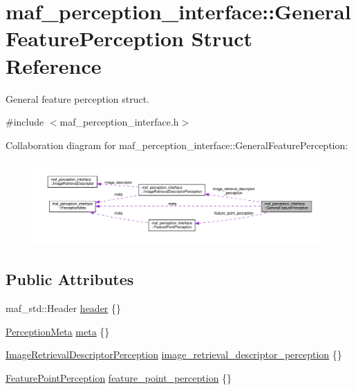 \hypertarget{structmaf__perception__interface_1_1GeneralFeaturePerception}{}\section{maf\+\_\+perception\+\_\+interface\+:\+:General\+Feature\+Perception Struct Reference}
\label{structmaf__perception__interface_1_1GeneralFeaturePerception}


General feature perception struct.  




{\ttfamily \#include $<$maf\+\_\+perception\+\_\+interface.\+h$>$}



Collaboration diagram for maf\+\_\+perception\+\_\+interface\+:\+:General\+Feature\+Perception\+:\nopagebreak
\begin{figure}[H]
\begin{center}
\leavevmode
\includegraphics[width=350pt]{structmaf__perception__interface_1_1GeneralFeaturePerception__coll__graph}
\end{center}
\end{figure}
\subsection*{Public Attributes}
\begin{DoxyCompactItemize}
\item 
maf\+\_\+std\+::\+Header \hyperlink{structmaf__perception__interface_1_1GeneralFeaturePerception_a2af51093fdb30aa1dd43a369800c89e4}{header} \{\}
\item 
\hyperlink{structmaf__perception__interface_1_1PerceptionMeta}{Perception\+Meta} \hyperlink{structmaf__perception__interface_1_1GeneralFeaturePerception_a624ca983a1c2b0ccf049eb7fa3d93cc1}{meta} \{\}
\item 
\hyperlink{structmaf__perception__interface_1_1ImageRetrievalDescriptorPerception}{Image\+Retrieval\+Descriptor\+Perception} \hyperlink{structmaf__perception__interface_1_1GeneralFeaturePerception_a706a6f618a539d7fe291991b5fa0babb}{image\+\_\+retrieval\+\_\+descriptor\+\_\+perception} \{\}
\item 
\hyperlink{structmaf__perception__interface_1_1FeaturePointPerception}{Feature\+Point\+Perception} \hyperlink{structmaf__perception__interface_1_1GeneralFeaturePerception_a73f9ab467c01c4e0e0351ace89a305a4}{feature\+\_\+point\+\_\+perception} \{\}
\end{DoxyCompactItemize}


